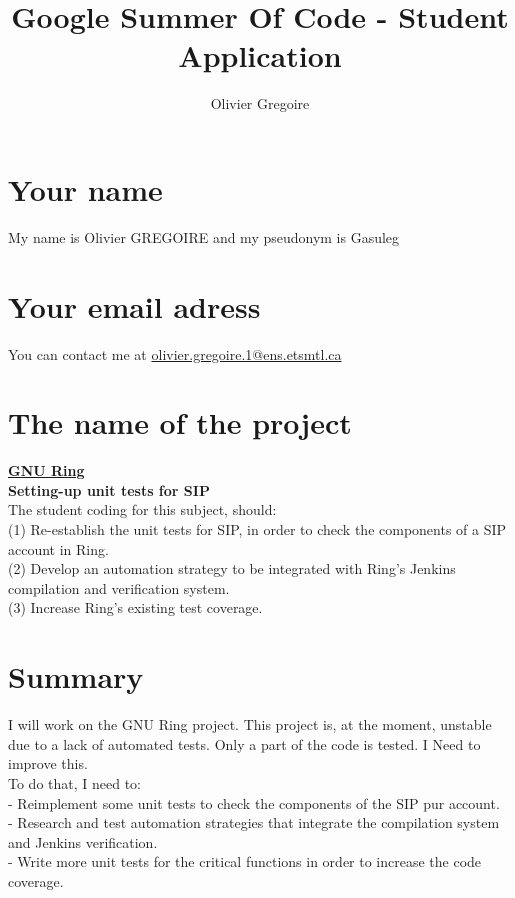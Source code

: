 \documentclass{article}
\title{Google Summer Of Code - Student Application}
\author{Olivier Gregoire}
\begin{document}
\maketitle

\section{Your name}
My name is Olivier GREGOIRE and my pseudonym is Gasuleg

\section{Your email adress}
You can contact me at
\href{mailto:olivier.gregoire.1@ens.etsmtl.ca}{olivier.gregoire.1@ens.etsmtl.ca}


\section{The name of the project}

\underline{\textbf{GNU Ring}} \\
\textbf{Setting-up unit tests for SIP} \\
The student coding for this subject, should: \\
(1) Re-establish the unit tests for SIP, in order to check the components of a SIP account in Ring.\\
(2) Develop an automation strategy to be integrated with Ring's Jenkins compilation and verification system. \\
(3) Increase Ring's existing test coverage. \\

\section{Summary}
I will work on the GNU Ring project. This project is, at the moment, unstable due to a lack of automated tests. Only a part of the code is tested. I Need to improve this. \\
To do that, I need to: \\
  - Reimplement some unit tests to check the components of the SIP pur account. \\
  - Research and test automation strategies that integrate the compilation system and Jenkins verification. \\
  - Write more unit tests for the critical functions in order to increase the code coverage.\\
\end{document}
